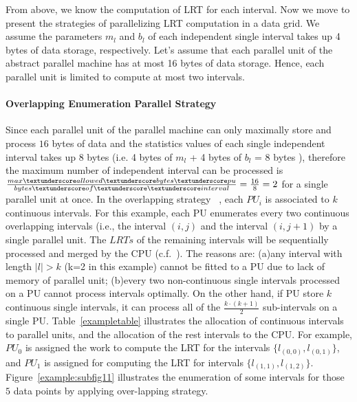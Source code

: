 \documentclass[AMA,LATO1COL]{WileyNJD-v2}
\begin{document}
From above, we know the computation of LRT for each interval. Now we move to present the strategies of parallelizing LRT computation in a data grid.  We assume the parameters $m_l$ and $b_l$ of each independent single interval takes up 4 bytes of data storage, respectively. Let's assume that each parallel unit of the abstract parallel machine has at most 16 bytes of data storage. Hence, each parallel unit is limited to compute at most two intervals.

\paragraph{Overlapping Enumeration Parallel Strategy}
Since each parallel unit of the parallel machine can only maximally store and process $16$ bytes of data and the statistics values of each single independent interval takes up $8$ bytes (i.e. 4 bytes of $m_l$ + 4 bytes of $b_l$ = 8 bytes ), therefore the maximum number of independent interval can be processed is $\frac{max\textunderscore allowed \textunderscore bytes\textunderscore pu }{bytes\textunderscore of\textunderscore \textunderscore interval}=\frac{16}{8}=2$ for a single parallel unit at once. In the overlapping strategy ~\cite{apweb}, each $PU_i$ is associated to $k$ continuous intervals. For this example, each PU enumerates every two continuous overlapping intervals (i.e., the interval $(i,j)$ and the interval $(i,j+1)$ by a single parallel unit.  The $LRTs$ of the remaining intervals will be sequentially processed and merged by the CPU (c.f.~\cite{apweb}). The reasons are: (a)any interval with length $|l|>k$ (k=2 in this example) cannot be fitted to a PU due to lack of memory of parallel unit; (b)every two non-continuous single intervals processed on a PU cannot process intervals optimally. On the other hand, if PU store $k$ continuous single intervals, it can process all of the ${\frac{k \cdot (k+1)}{2}}$ sub-intervals on a single PU. Table~\ref{exampletable} illustrates the allocation of continuous intervals to parallel units, and the allocation of the rest intervals to the CPU.  For example, $PU_0$ is assigned the work to compute the LRT for the intervals $\{l_{(0,0)},l_{(0,1)}\}$, and $PU_1$ is assigned for computing the LRT for intervals $\{l_{(1,1)},l_{(1,2)}\}$. Figure~\ref{example:subfig11} illustrates the enumeration of some intervals for those $5$ data points by applying over-lapping strategy.
\end{document}
